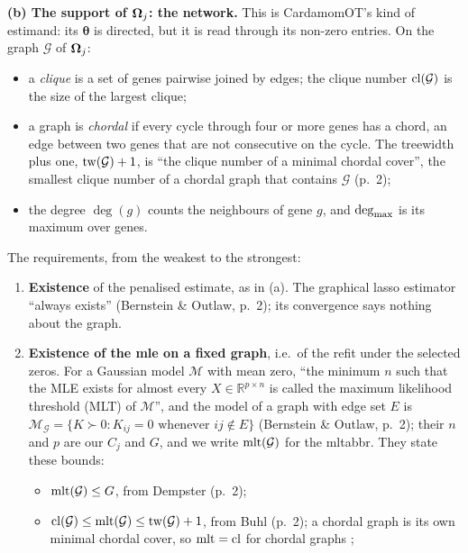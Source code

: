 \documentclass[11pt,a4paper]{article}
\begin{document}
\begin{idbox}[title={Identifiability: covariance versus network}]
\medskip
\textbf{(b) The support of $\bm{\Omega}_j$: the network.} This is CardamomOT's kind of estimand: its
$\bm\theta$ is directed, but it is read through its non-zero entries. On the graph $\mathcal G$ of
$\bm{\Omega}_j$:
\begin{itemize}
  \item a \emph{clique} is a set of genes pairwise joined by edges; the clique number $\operatorname{cl}(\mathcal G)$
        is the size of the largest clique;
  \item a graph is \emph{chordal} if every cycle through four or more genes has a chord, an edge between
        two genes that are not consecutive on the cycle. The treewidth plus one, $\operatorname{tw}(\mathcal G)+1$, is
        \enquote{the clique number of a minimal chordal cover}, the smallest clique number of a chordal
        graph that contains $\mathcal G$ \parencite{bernsteinMaximumLikelihoodThresholds2023} (p.~2);
  \item the degree $\deg(g)$ counts the neighbours of gene $g$, and $\deg_{\max}$ is its maximum over genes.
\end{itemize}
The requirements, from the weakest to the strongest:
\begin{enumerate}[leftmargin=1.6em]
  \item \textbf{Existence} of the penalised estimate, as in (a). The graphical lasso estimator
        \enquote{always exists} (Bernstein \& Outlaw, p.~2); its convergence says nothing about the graph.
  \item \textbf{Existence of the \gls{mle} on a fixed graph}, i.e.\ of the refit under the selected
        zeros. For a Gaussian model $\mathcal M$ with mean zero, \enquote{the minimum $n$ such that the MLE
        exists for almost every $X\in\mathbb R^{p\times n}$ is called the maximum likelihood threshold
        (MLT) of $\mathcal M$}, and the model of a graph with edge set $E$ is
        $\mathcal M_{\mathcal G}=\{K\succ0:K_{ij}=0\text{ whenever }ij\notin E\}$ (Bernstein \& Outlaw,
        p.~2); their $n$ and $p$ are our $C_j$ and $G$, and we write $\operatorname{mlt}(\mathcal G)$ for the
        \gls{mltabbr}. They state these bounds:
        \begin{itemize}
          \item $\operatorname{mlt}(\mathcal G)\le G$, from Dempster (p.~2);
          \item $\operatorname{cl}(\mathcal G)\le\operatorname{mlt}(\mathcal G)\le\operatorname{tw}(\mathcal G)+1$, from Buhl (p.~2); a chordal
                graph is its own minimal chordal cover, so $\operatorname{mlt}=\operatorname{cl}$ for chordal graphs
                \parencite{uhlerGeometryMaximumLikelihood2012,grossMaximumLikelihoodThreshold2018};

\end{itemize}
\end{enumerate}
\end{idbox}
\end{document}
